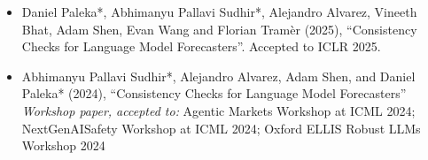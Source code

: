 \documentclass{article}
\begin{document}
\begin{itemize}

    \item 
          Daniel Paleka*, Abhimanyu Pallavi Sudhir*, Alejandro Alvarez, Vineeth Bhat, Adam Shen, Evan Wang and Florian Tram\`er (2025), ``Consistency Checks for Language Model Forecasters''. Accepted to ICLR 2025.

    \item
          Abhimanyu Pallavi Sudhir*, Alejandro Alvarez, Adam Shen, and Daniel Paleka* (2024), ``Consistency Checks for Language Model Forecasters'' \emph{Workshop paper, accepted to:} Agentic Markets Workshop at ICML 2024; NextGenAISafety Workshop at ICML 2024; Oxford ELLIS Robust LLMs Workshop 2024
\end{itemize}
\end{document}
